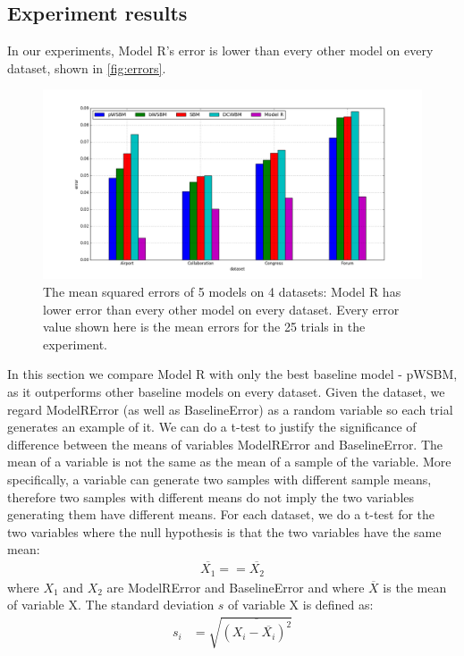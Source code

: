 \documentclass[conference]{IEEEtran}
\begin{document}
\subsection{Experiment results}
In our experiments,
Model R's error is lower than every other model on every dataset,
shown in \autoref{fig:errors}.
\begin{figure}[!htb]\centering
	\includegraphics[width=1\textwidth]{link-weight-errors}
	\caption{
		The mean squared errors of 5 models on 4 datasets:
		Model R has lower error than every other model on every dataset.
		Every error value shown here is the mean errors for the 25 trials in the experiment.
	}
	\label{fig:errors}
\end{figure}
In this section we compare Model R with only the best baseline model - pWSBM, as it outperforms other baseline models on every dataset.
Given the dataset,
we regard ModelRError (as well as BaselineError) as a random variable
so each trial generates an example of it.
We can do a t-test to justify the significance of difference between the means of variables ModelRError and BaselineError.
The mean of a variable is not the same as the mean of a sample of the variable.
More specifically, a variable can generate two samples with different sample means,
therefore two samples with different means do not imply the two variables generating them have different means.
For each dataset, we do a t-test for the two variables where the null hypothesis is that the two variables have the same mean:
\begin{align*}
\overline{X_1} == \overline{X_2}
\end{align*}
where $ X_1 $ and $ X_2 $ are ModelRError and BaselineError and
where $ \overline{X} $ is the mean of variable X.
The standard deviation $ s $ of variable X is defined as:
\begin{align*}
	s_i &= \sqrt{\overline{(X_i - \overline{X_i})^2}}
\end{align*}
\end{document}
